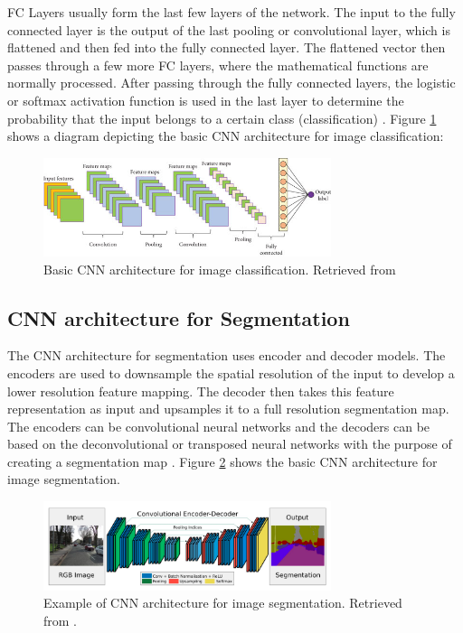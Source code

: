 \ac{FC} Layers usually form the last few layers of the network. The input to the fully connected layer is the output of the last pooling or convolutional layer, which is flattened and then fed into the fully connected layer. The flattened vector then passes through a few more \ac{FC} layers, where the mathematical functions are normally processed. After passing through the fully connected layers, the logistic or softmax activation function is used in the last layer to determine the probability that the input belongs to a certain class (classification) \cite{guide:cnn}. Figure \ref{fig:cnn_class} shows a diagram depicting the basic \ac{CNN} architecture for image classification:

\begin{figure}[!htb]
  \centering
  \includegraphics[width=0.75\textwidth]{Images/cnn_class.jpg}
  \caption[Basic \ac{CNN} architecture for image classification.]{Basic \ac{CNN} architecture for image classification. Retrieved from \cite{image:CNN}}
  \label{fig:cnn_class}
\end{figure}

\subsection{CNN architecture for Segmentation}

The \ac{CNN} architecture for segmentation uses encoder and decoder models. The encoders are used to downsample the spatial resolution of the input to develop a lower resolution feature mapping. The decoder then takes this feature representation as input and upsamples it to a full resolution segmentation map. The encoders can be convolutional neural networks and the decoders can be based on the deconvolutional or transposed neural networks with the purpose of creating a segmentation map \cite{enconders}. Figure \ref{fig:cnn_seg} shows the basic \ac{CNN} architecture for image segmentation.

\begin{figure}[!htb]
  \centering
  \includegraphics[width=0.75\textwidth]{Images/seg_cnn.jpg}
  \caption[Example of \ac{CNN} architecture for image segmentation.]{Example of \ac{CNN} architecture for image segmentation. Retrieved from \cite{segnet}.}
  \label{fig:cnn_seg}
\end{figure}

